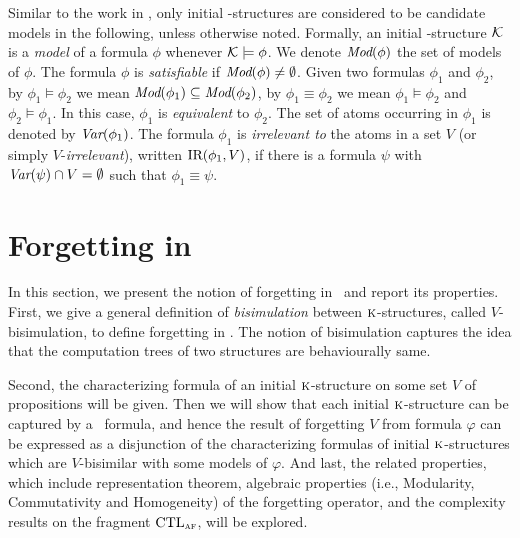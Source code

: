 \documentclass{article}
\begin{document}
Similar to the work in \cite{browne1988characterizing,Bolotov:1999:JETAI},
only initial \MPK-structures are considered to be candidate models
in the following, unless otherwise noted. Formally,
an initial \MPK-structure $\cal K$ is a {\em model} of a formula $\phi$
whenever ${\cal K}\models\phi$.
We denote $\textit{Mod}(\phi)$ the set of models of $\phi$.
The formula
$\phi$  is {\em satisfiable}
if $\textit{Mod}(\phi)\neq\emptyset$.
Given two formulas $\phi_1$ and $\phi_2$,  by $\phi_1\models\phi_2$ we mean $\textit{Mod}(\phi_1)\subseteq\textit{Mod}(\phi_2)$, by $\phi_1\equiv\phi_2$ we mean $\phi_1\models\phi_2$ and $\phi_2\models\phi_1$.
In this case, $\phi_1$ is {\em equivalent} to $\phi_2$.
The set of atoms occurring in $\phi_1$ is denoted by $\textit{Var}(\phi_1)$.
The formula $\phi_1$ is {\em irrelevant to} the atoms in a set $V$ (or simply $V$-{\em irrelevant}), written $\textrm{IR}(\phi_1,V)$,
if there is a formula $\psi$ with
$\textit{Var}(\psi)\cap V=\emptyset$ such that $\phi_1\equiv\psi$.




\section{Forgetting in \CTL}
\label{forgetting}
In this section, we present the notion of forgetting in \CTL\ and report its properties.
First, we give a general definition of \emph{bisimulation} between $\textsc{k}$-structures, called $V$-bisimulation, to define forgetting in \CTL.
The notion of bisimulation captures the idea that the computation trees of two structures are behaviourally same.

 Second, the characterizing formula of an initial $\textsc{k}$-structure on some set $V$ of propositions will be given. Then we will show that each initial $\textsc{k}$-structure can be captured by a \CTL\ formula, and hence the result of forgetting $V$ from formula $\varphi$ can be expressed as a disjunction of the characterizing formulas of initial $\textsc{k}$-structures which are $V$-bisimilar with some models of $\varphi$.
And last, the related properties, which include representation theorem, algebraic properties (i.e., Modularity, Commutativity and Homogeneity) of the forgetting operator,  and the complexity results on the fragment $\textrm{CTL}_{\textsc{a}\textsc{f}}$, will be explored.
\end{document}
